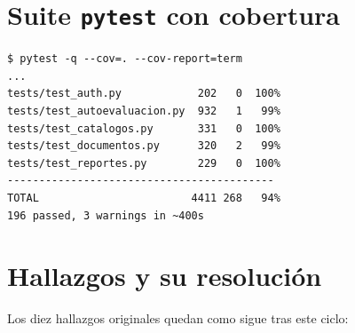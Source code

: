 \documentclass{computacion}
\begin{document}
\section{Suite \texttt{pytest} con cobertura}

\begin{Verbatim}[fontsize=\small, frame=single]
$ pytest -q --cov=. --cov-report=term
...
tests/test_auth.py            202   0  100%
tests/test_autoevaluacion.py  932   1   99%
tests/test_catalogos.py       331   0  100%
tests/test_documentos.py      320   2   99%
tests/test_reportes.py        229   0  100%
------------------------------------------
TOTAL                        4411 268   94%
196 passed, 3 warnings in ~400s
\end{Verbatim}

\section{Hallazgos y su resolución}
\label{sec:hallazgos}

Los diez hallazgos originales quedan como sigue tras este ciclo:
\end{document}
